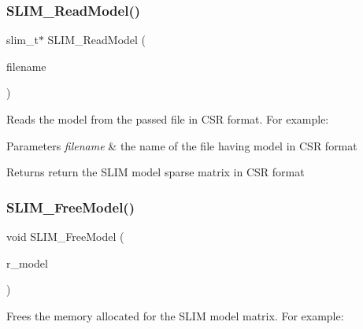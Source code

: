 \subsubsection{\texorpdfstring{SLIM\_ReadModel()}{SLIM\_ReadModel()}}
{\footnotesize\ttfamily slim\+\_\+t$\ast$ S\+L\+I\+M\+\_\+\+Read\+Model (\begin{DoxyParamCaption}\item[{char $\ast$}]{filename }\end{DoxyParamCaption})}



Reads the model from the passed file in C\+SR format. For example\+: 


\begin{DoxyCode}{0}
\end{DoxyCode}
 
\begin{DoxyParams}{Parameters}
{\em filename} & the name of the file having model in C\+SR format \\
\hline
\end{DoxyParams}
\begin{DoxyReturn}{Returns}
return the S\+L\+IM model sparse matrix in C\+SR format 
\end{DoxyReturn}
\mbox{\label{group__slimapi_ga2224ba0f1e06e728423bcf5c63da5fea}} 
\subsubsection{\texorpdfstring{SLIM\_FreeModel()}{SLIM\_FreeModel()}}
{\footnotesize\ttfamily void S\+L\+I\+M\+\_\+\+Free\+Model (\begin{DoxyParamCaption}\item[{slim\+\_\+t $\ast$$\ast$}]{r\+\_\+model }\end{DoxyParamCaption})}



Frees the memory allocated for the S\+L\+IM model matrix. For example\+: 


\begin{DoxyCode}{0}
\end{DoxyCode}
 

